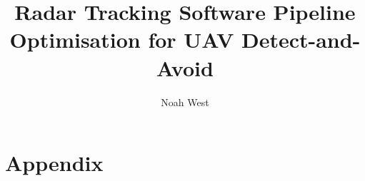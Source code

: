 \documentclass[logo]{style/usydthesis}
\makeatletter
\renewcommand{\tableofcontents}{%
  \@starttoc{toc}\contentsname%
}
\makeatother
\begin{document}
\renewcommand{\thepage}{\roman{page}}	
\pagestyle{plain} %
\title{{\bf\Huge Radar Tracking Software Pipeline Optimisation for
UAV Detect-and-Avoid}}
\author{Noah West}

\maketitle
{}

% 

\newpage

\newpage



\setcounter{tocdepth}{2}
\newpage
{}

\tableofcontents
{\let\clearpage\relax\printglossary[type=\acronymtype, title=Acronyms, nonumberlist]}
\newpage
\listoffigures
\newpage
\listoftables
\newpage


\setcounter{page}{1}
\setcounter{chapter}{0}

\renewcommand{\thepage}{\arabic{page}}	
\setupParagraphs





 




%
%
\glsaddall
\printbibliography

\appendix
\newpage
\chapter{Appendix}





% 
\end{document}
